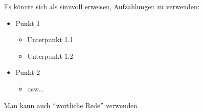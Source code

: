 \documentclass[11pt,
               a4paper,
               parskip=half,
               ]{scrartcl}
\begin{document}
Es könnte sich als sinnvoll erweisen,
Aufzählungen zu verwenden:
\begin{itemize}
  \item Punkt 1
  \begin{itemize}
    \item Unterpunkt 1.1
    \item Unterpunkt 1.2
  \end{itemize}

  \item Punkt 2
  \begin{itemize}
    \item usw\dots
  \end{itemize}
\end{itemize}

Man kann auch \enquote{wörtliche Rede} verwenden.


\clearpage
\end{document}
